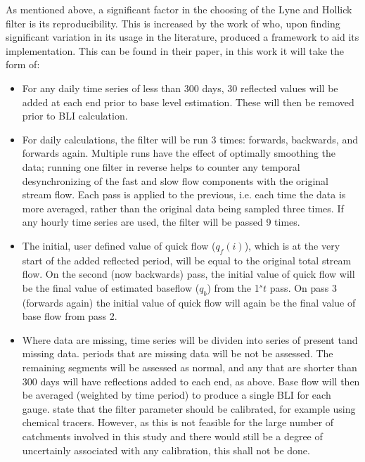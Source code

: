 \documentclass[DIV=calc, paper=a4, fontsize=11pt, twocolumn]{scrartcl}	 %
\begin{document}
As mentioned above, a significant factor in the choosing of the Lyne and Hollick filter is its reproducibility. This is increased by the work of \citet{Ladson2013} who, upon finding significant variation in its usage in the literature, produced a framework to aid its implementation. This can be found in their paper, in this work it will take the form of:
\begin{itemize}
	\item For any daily time series of less than 300 days, 30 reflected values will be added at each end prior to base level estimation. These will then be removed prior to BLI calculation.
	\item For daily calculations, the filter will be run 3 times: forwards, backwards, and forwards again. Multiple runs have the effect of optimally smoothing the data; running one filter in reverse helps to counter any temporal desynchronizing of the fast and slow flow components with the original stream flow. Each pass is applied to the previous, i.e. each time the data is more averaged, rather than the original data being sampled three times.
	If any hourly time series are used, the filter will be passed 9 times.
	\item The initial, user defined value of quick flow ($q_f(i)$), which is at the very start of the added reflected period, will be equal to the original total stream flow. On the second (now backwards) pass, the initial value of quick flow will be the final value of estimated baseflow ($q_b$) from the 1$^st$ pass. On pass 3 (forwards again) the initial value of quick flow will again be the final value of base flow from pass 2.
	\item Where data are missing, time series will be dividen into series of present tand missing data. periods that are missing data will be not be assessed. The remaining segments will be assessed as normal, and any that are shorter than 300 days will have reflections added to each end, as above. Base flow will then be averaged (weighted by time period) to produce a single BLI for each gauge.
	\citet{Ladson2013} state that the filter parameter should be calibrated, for example using chemical tracers. However, as this is not feasible for the large number of catchments involved in this study and there would still be a degree of uncertainly associated with any calibration, this shall not be done.
	
\end{itemize}

\end{document}
